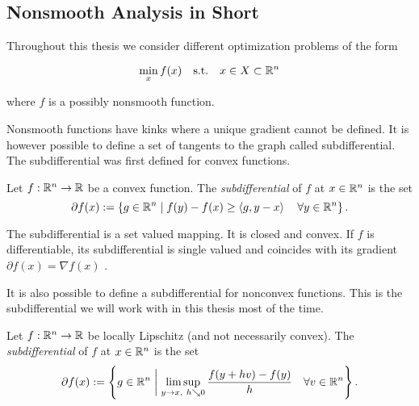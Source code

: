 

\subsection{Nonsmooth Analysis in Short}

Throughout this thesis we consider different optimization problems of the form

\begin{equation*}
\min_{x} f(x) \quad \text{s.t.} \quad x \in X \subset \mathbb{R}^n
\label{min_prob}
\end{equation*}

where \(f\) is a possibly nonsmooth function.


Nonsmooth functions have kinks where a unique gradient cannot be defined. It is however possible to define a set of tangents to the graph called subdifferential.
The subdifferential was first defined for convex functions.

\begin{definition}
\label{conv_subdiff}
	Let \(f: \mathbb{R}^n \to \mathbb{R} \) be a convex function. The \emph{subdifferential} of \(f\) at \(x\in \mathbb{R}^n\) is the set 
	\[ \partial f(x) := \left\{g \in \mathbb{R}^n \mid f(y)-f(x) \geq \left\langle g,y-x \right\rangle \quad \forall y \in \mathbb{R}^n \right\}. \]
\end{definition}

The subdifferential is a set valued mapping. It is closed and convex. If \(f\) is differentiable, its subdifferential is single valued and coincides with its gradient \(\partial f(x) = {\nabla f(x)}\) \cite{Rockafellar1970}.


It is also possible to define a subdifferential for nonconvex functions. This is the subdifferential we will work with in this thesis most of the time.

\begin{definition}
\label{nonconv_subdiff}
	Let \(f: \mathbb{R}^n \to \mathbb{R}\) be locally Lipschitz (and not necessarily convex).
	The \emph{subdifferential} of \(f\) at \(x \in \mathbb{R}^n\) is the set
\[ \partial f(x) := \left\{g \in \mathbb{R}^n \biggm| \limsup_{y \to x,~ h \searrow 0}\frac{f(y+hv)-f(y)}{h} \quad \forall v \in \mathbb{R}^n \right\}. \]
\end{definition} 

